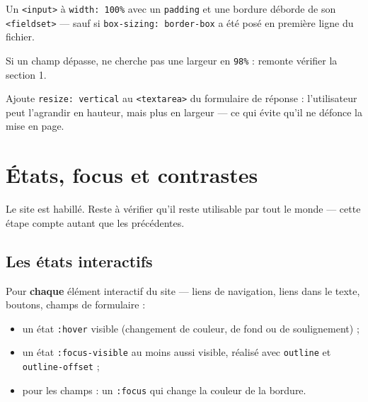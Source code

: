\documentclass[a4paper,11pt]{article}
\begin{document}
\begin{tcolorbox}[attention, title={\texttt{width: 100\%} sur un champ, sans \texttt{border-box}}]
Un \texttt{<input>} à \texttt{width: 100\%} avec un \texttt{padding} et une bordure déborde de son \texttt{<fieldset>} --- sauf si \texttt{box-sizing: border-box} a été posé en première ligne du fichier.

\vspace{3pt}
Si un champ dépasse, ne cherche pas une largeur en \texttt{98\%} : remonte vérifier la section 1.
\end{tcolorbox}

\begin{tcolorbox}[astuce, title={Le \texttt{<textarea>} se redimensionne}]
Ajoute \texttt{resize: vertical} au \texttt{<textarea>} du formulaire de réponse : l'utilisateur peut l'agrandir en hauteur, mais plus en largeur --- ce qui évite qu'il ne défonce la mise en page.
\end{tcolorbox}

\section{États, focus et contrastes}

Le site est habillé. Reste à vérifier qu'il reste utilisable par tout le monde --- cette étape compte autant que les précédentes.

\subsection{Les états interactifs}

\begin{tcolorbox}[definition, title={À produire}]
Pour \textbf{chaque} élément interactif du site --- liens de navigation, liens dans le texte, boutons, champs de formulaire :
\begin{itemize}
  \item un état \texttt{:hover} visible (changement de couleur, de fond ou de soulignement) ;
  \item un état \texttt{:focus-visible} au moins aussi visible, réalisé avec \texttt{outline} et \texttt{outline-offset} ;
  \item pour les champs : un \texttt{:focus} qui change la couleur de la bordure.
\end{itemize}
\end{tcolorbox}
\end{document}
